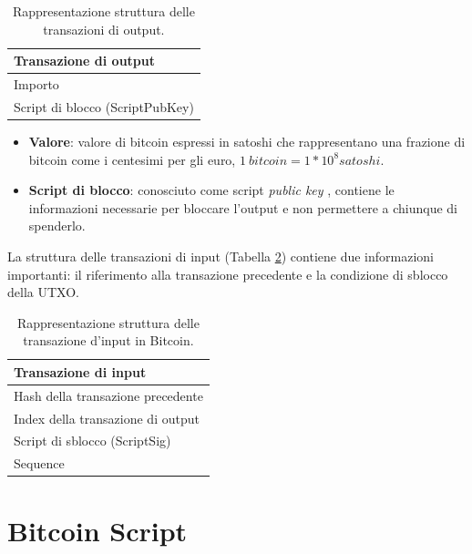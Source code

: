 \begin{table}[H]
       \centering\small
           \begin{tabular}{l}
               \toprule
               Transazione di output\\
               \midrule
               Importo   \\
               Script di blocco (ScriptPubKey) \\
               \bottomrule
       \end{tabular}
       \caption{Rappresentazione struttura delle transazioni di output.\label{tab:outputtransaztionbitcoin}}
   \end{table}

\begin{itemize}
  \item {\bf Valore\/}: valore di bitcoin espressi in satoshi che rappresentano una frazione di bitcoin come i centesimi per gli euro, \( 1\: bitcoin = 1*10^8 satoshi \).
  \item {\bf Script di blocco\/}: conosciuto come script {\it public key \/}, contiene le informazioni necessarie per bloccare l’output e non permettere a chiunque di spenderlo.
\end{itemize}

La struttura delle transazioni di input (Tabella \ref{tab:inputtransaztionbitcoin}) contiene due informazioni importanti: il riferimento alla transazione precedente e la condizione di sblocco della UTXO.

\begin{table}[H]
       \centering\small
           \begin{tabular}{l}
               \toprule
               Transazione di input\\
               \midrule
               Hash della transazione precedente   \\
               Index della transazione di output \\
               Script di sblocco (ScriptSig) \\
               Sequence \\
               \bottomrule
       \end{tabular}
       \caption{Rappresentazione struttura delle transazione d’input in Bitcoin.\label{tab:inputtransaztionbitcoin}}
   \end{table}

\section{Bitcoin Script}
\label{sec:bitcoinScriptBitcoin}

